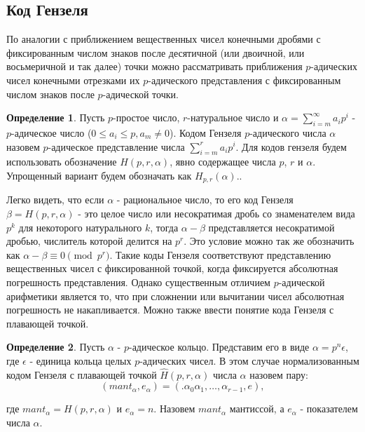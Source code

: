 \documentclass[master, och, diploma, times]{sty/SCWorks}
\theoremstyle{plain}
\theoremstyle{definition}
\newtheorem{defn}{Определение}[section]
\numberwithin{equation}{section}
\begin{document}
\subsection{Код Гензеля}
По аналогии с приближением вещественных чисел конечными дробями с фиксированным числом знаков после десятичной (или двоичной, или восьмеричной и так далее) точки можно рассматривать приближения $p$-адических чисел конечными отрезками их $p$-адического представления с фиксированным числом знаков после $p$-адической точки.

\begin{defn}
Пусть $p$-простое число, $r$-натуральное число и $\alpha=\sum\limits^{\infty}_{i=m} a_ip^i$ - $p$-адическое число ($0 \le a_i \le p, a_m \neq 0$). Кодом Гензеля $p$-адического числа $\alpha$ назовем $p$-адическое представление числа $\sum\limits_{i=m}^{r}a_ip^i$. Для кодов гензеля будем использовать обозначение $H(p,r,\alpha)$, явно содержащее числа $p$, $r$ и $\alpha$. Упрощенный вариант будем обозначать как $H_{p,r}(\alpha)$.\cite{bib:analysis:gouvea}.
\end{defn}

Легко видеть, что если $\alpha$ - рациональное число, то его код Гензеля $\beta=H(p,r, \alpha)$ - это целое число или несократимая дробь со знаменателем вида $p^k$ для некоторого натурального $k$, тогда $\alpha-\beta$ представляется несократимой дробью, числитель которой делится на $p^r$. Это условие можно так же обозначить как $\alpha - \beta \equiv 0 \pmod {p^r}$.  Такие коды Гензеля соответствуют представлению вещественных чисел с фиксированной точкой, когда фиксируется абсолютная погрешность представления. Однако существенным отличием $p$-адической арифметики является то, что при сложнении или вычитании чисел абсолютная погрешность не накапливается. Можно также ввести понятие кода Гензеля с плавающей точкой.

\begin{defn}
Пусть $\alpha$ - $p$-адическое кольцо. Представим его в виде $\alpha=p^n\epsilon$, где $\epsilon$ - единица кольца целых $p$-адических чисел. В этом случае нормализованным кодом Гензеля с плавающей точкой $\hat H (p, r, \alpha)$ числа $\alpha$ назовем пару:
\begin{equation}
	(mant_{\alpha},e_{\alpha})=(.\alpha_0\alpha_1,\dots,\alpha_{r-1},e),
\end{equation}

\noindent где \mbox{$mant_\alpha = H(p,r,\alpha)$} и $e_\alpha=n$. Назовем $mant_\alpha$ мантиссой, а $e_\alpha$ - показателем числа $\alpha$\cite{bib:analisys:khrennikov:2}.
\end{defn}
\end{document}
